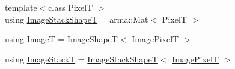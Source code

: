 \begin{DoxyCompactItemize}
{\footnotesize template$<$class PixelT $>$ }\\using \hyperlink{classmappel_1_1ImageFormat1DBase_ad9d4f0c3d04f3cecf3bf6b4709dcb4a8}{Image\+Stack\+ShapeT} = arma\+::\+Mat$<$ PixelT $>$
\item 
using \hyperlink{classmappel_1_1ImageFormat1DBase_a521a1ff391a52a636fac4aac7c7ba02c}{ImageT} = \hyperlink{classmappel_1_1ImageFormat1DBase_a20d315459b83c348b1465614699783b3}{Image\+ShapeT}$<$ \hyperlink{classmappel_1_1ImageFormat1DBase_a156fe500fd249cb4b77bdb0abc0dd0ea}{Image\+PixelT} $>$
\item 
using \hyperlink{classmappel_1_1ImageFormat1DBase_a81e3246d1c5c37ebf9077b7b5bd25a76}{Image\+StackT} = \hyperlink{classmappel_1_1ImageFormat1DBase_ad9d4f0c3d04f3cecf3bf6b4709dcb4a8}{Image\+Stack\+ShapeT}$<$ \hyperlink{classmappel_1_1ImageFormat1DBase_a156fe500fd249cb4b77bdb0abc0dd0ea}{Image\+PixelT} $>$
\end{DoxyCompactItemize}
